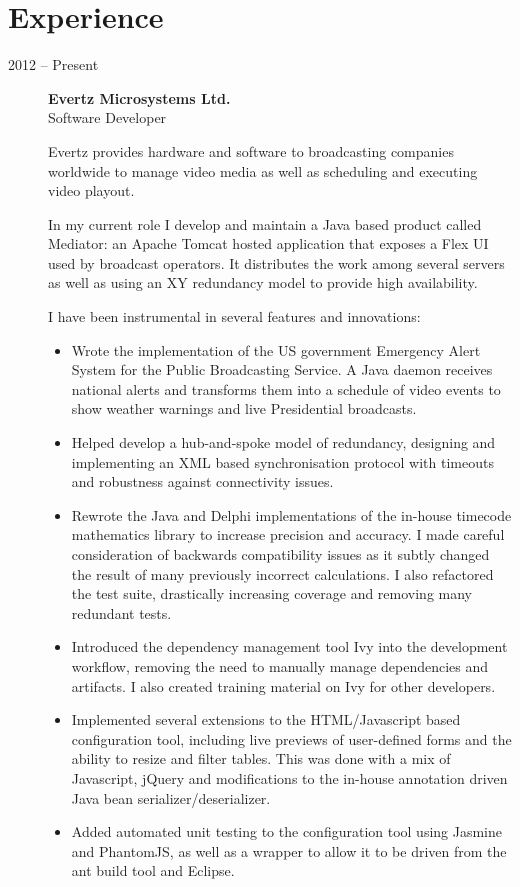 \documentclass[10pt]{report}
\begin{document}
\section*{Experience}
\begin{description}
  \item[2012 -- Present]
    \textbf{Evertz Microsystems Ltd.} \\
    Software Developer

    Evertz provides hardware and software to broadcasting companies worldwide to manage video media as well as scheduling and executing video playout.

    In my current role I develop and maintain a Java based product called Mediator: an Apache Tomcat hosted application that exposes a Flex UI used by broadcast operators. It distributes the work among several servers as well as using an XY redundancy model to provide high availability.

    I have been instrumental in several features and innovations:

    \begin{itemize}
      \item Wrote the implementation of the US government Emergency Alert System for the Public Broadcasting Service. A Java daemon receives national alerts and transforms them into a schedule of video events to show weather warnings and live Presidential broadcasts.
      \item Helped develop a hub-and-spoke model of redundancy, designing and implementing an XML based synchronisation protocol with timeouts and robustness against connectivity issues.
      \item Rewrote the Java and Delphi implementations of the in-house timecode mathematics library to increase precision and accuracy. I made careful consideration of backwards compatibility issues as it subtly changed the result of many previously incorrect calculations. I also refactored the test suite, drastically increasing coverage and removing many redundant tests.
      \item Introduced the dependency management tool Ivy into the development workflow, removing the need to manually manage dependencies and artifacts. I also created training material on Ivy for other developers.
      \item Implemented several extensions to the HTML/Javascript based configuration tool, including live previews of user-defined forms and the ability to resize and filter tables. This was done with a mix of Javascript, jQuery and modifications to the in-house annotation driven Java bean serializer/deserializer.
      \item Added automated unit testing to the configuration tool using Jasmine and PhantomJS, as well as a wrapper to allow it to be driven from the ant build tool and Eclipse.
    \end{itemize}


\end{description}
\end{document}
